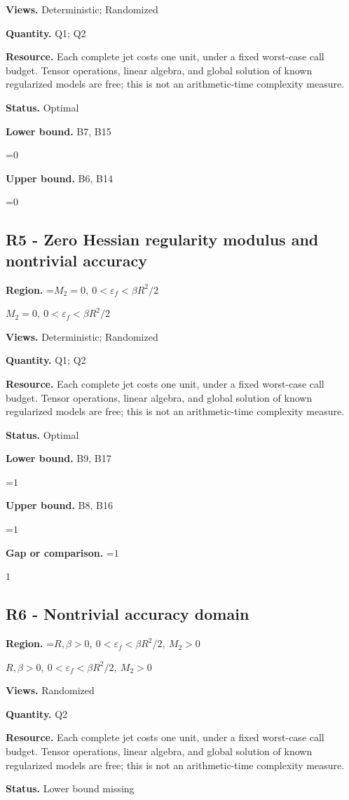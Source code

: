 \documentclass[10pt,a4paper]{article}
\newcommand{\AtlasMath}[1]{\par\begingroup\centering\setbox0=\hbox{$\displaystyle #1$}\ifdim\wd0>1.4\linewidth\typeout{ATLAS WIDE FORMULA: \the\wd0}\fi\ifdim\wd0>\linewidth\resizebox{\linewidth}{!}{\box0}\else\box0\fi\par\endgroup}
\newcommand{\AtlasInlineMath}[1]{\begingroup\setbox0=\hbox{$#1$}\ifdim\wd0>.4\linewidth\endgroup\AtlasMath{#1}\else\endgroup$#1$\fi}
\begin{document}
\textbf{Views.} Deterministic; Randomized

\textbf{Quantity.} Q1; Q2

\textbf{Resource.} Each complete jet costs one unit, under a fixed worst-case call budget. Tensor operations, linear algebra, and global solution of known regularized models are free; this is not an arithmetic-time complexity measure.

\textbf{Status.} Optimal

\textbf{Lower bound.} B7, B15

\AtlasMath{0}
\textbf{Upper bound.} B6, B14

\AtlasMath{0}
\subsection{R5 - Zero Hessian regularity modulus and nontrivial accuracy}
\textbf{Region.} \AtlasInlineMath{M_2=0,\ 0<\varepsilon_f<\beta R^2/2}

\textbf{Views.} Deterministic; Randomized

\textbf{Quantity.} Q1; Q2

\textbf{Resource.} Each complete jet costs one unit, under a fixed worst-case call budget. Tensor operations, linear algebra, and global solution of known regularized models are free; this is not an arithmetic-time complexity measure.

\textbf{Status.} Optimal

\textbf{Lower bound.} B9, B17

\AtlasMath{1}
\textbf{Upper bound.} B8, B16

\AtlasMath{1}
\textbf{Gap or comparison.} \AtlasInlineMath{1}

\subsection{R6 - Nontrivial accuracy domain}
\textbf{Region.} \AtlasInlineMath{R,\beta>0,\ 0<\varepsilon_f<\beta R^2/2,\ M_2>0}

\textbf{Views.} Randomized

\textbf{Quantity.} Q2

\textbf{Resource.} Each complete jet costs one unit, under a fixed worst-case call budget. Tensor operations, linear algebra, and global solution of known regularized models are free; this is not an arithmetic-time complexity measure.

\textbf{Status.} Lower bound missing
\end{document}
